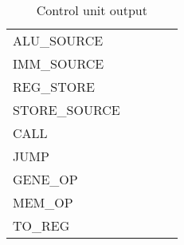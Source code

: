 \begin{table}
\begin{tabular}{| l | c | c | c |c |}
    \hline  
    ALU\_SOURCE       &              &          &       &            \\
    IMM\_SOURCE       &              &          &       &            \\
    REG\_STORE        &              &          &       &            \\
    STORE\_SOURCE     &              &          &       &            \\
    CALL              &              &          &       &            \\
    JUMP              &              &          &       &            \\
    GENE\_OP          &              &          &       &            \\
    MEM\_OP           &              &          &       &            \\
    TO\_REG           &              &          &       &            \\   
    \hline
    \end{tabular}
    \caption{Control unit output}
    \label{fpga:fitness:control_unit_out_tbl}

\end{table}
